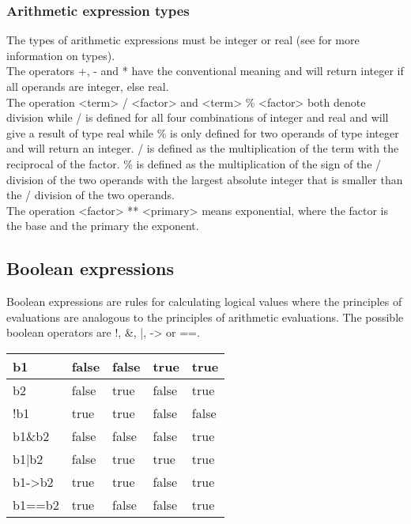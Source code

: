 \documentclass{article}
\begin{document}
\subsubsection{Arithmetic expression types} \label{arithexptypes}
The types of arithmetic expressions must be integer or real (see  for more information on types).\\
The operators +, - and * have the conventional meaning and will return integer if all operands are integer, else real.\\
The operation <term> / <factor> and <term> \% <factor> both denote division while / is defined for all four combinations of integer and real and will give a result of type real while \% is only defined for two operands of type integer and will return an integer. / is defined as the multiplication of the term with the reciprocal of the factor. \% is defined as the multiplication of the sign of the / division of the two operands with the largest absolute integer that is smaller than the / division of the two operands.\\
The operation <factor> ** <primary> means exponential, where the factor is the base and the primary the exponent.

\subsection{Boolean expressions}
Boolean expressions are rules for calculating logical values where the principles of evaluations are analogous to the principles of arithmetic evaluations. The possible boolean operators are !, \&, |, -\textgreater{} or ==. 

\begin{table}[h]
	\begin{tabular}{|l|l|l|l|l|}
		\hline
		b1                  & false & false & true  & true  \\ \hline
		b2                  & false & true  & false & true  \\ \hline
		!b1                 & true  & true  & false & false \\ \hline
		b1\&b2              & false & false & false & true  \\ \hline
		b1|b2               & false & true  & true  & true  \\ \hline
		b1-\textgreater{}b2 & true  & true  & false & true  \\ \hline
		b1==b2              & true  & false & false & true  \\ \hline
	\end{tabular}
\end{table}
\end{document}
